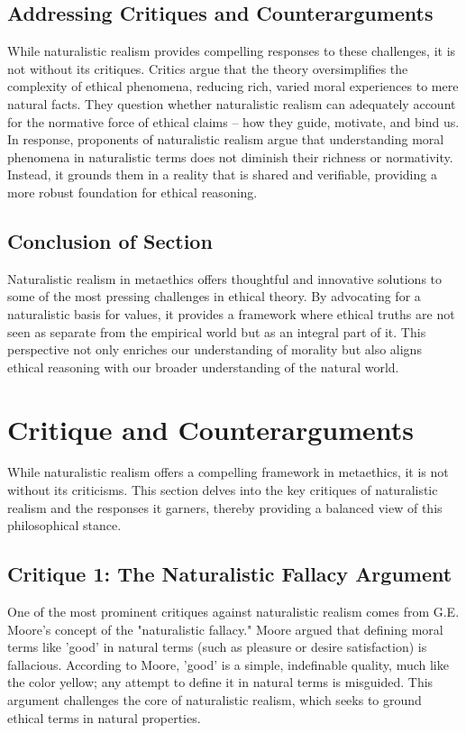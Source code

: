\documentclass[12pt,a4paper]{article}
\begin{document}
\subsection{Addressing Critiques and Counterarguments}
While naturalistic realism provides compelling responses to these challenges, it is not without its critiques. Critics argue that the theory oversimplifies the complexity of ethical phenomena, reducing rich, varied moral experiences to mere natural facts. They question whether naturalistic realism can adequately account for the normative force of ethical claims – how they guide, motivate, and bind us. In response, proponents of naturalistic realism argue that understanding moral phenomena in naturalistic terms does not diminish their richness or normativity. Instead, it grounds them in a reality that is shared and verifiable, providing a more robust foundation for ethical reasoning.

\subsection{Conclusion of Section}
Naturalistic realism in metaethics offers thoughtful and innovative solutions to some of the most pressing challenges in ethical theory. By advocating for a naturalistic basis for values, it provides a framework where ethical truths are not seen as separate from the empirical world but as an integral part of it. This perspective not only enriches our understanding of morality but also aligns ethical reasoning with our broader understanding of the natural world.

\section{Critique and Counterarguments}

While naturalistic realism offers a compelling framework in metaethics, it is not without its criticisms. This section delves into the key critiques of naturalistic realism and the responses it garners, thereby providing a balanced view of this philosophical stance.

\subsection{Critique 1: The Naturalistic Fallacy Argument}
One of the most prominent critiques against naturalistic realism comes from G.E. Moore's concept of the "naturalistic fallacy." Moore argued that defining moral terms like 'good' in natural terms (such as pleasure or desire satisfaction) is fallacious. According to Moore, 'good' is a simple, indefinable quality, much like the color yellow; any attempt to define it in natural terms is misguided. This argument challenges the core of naturalistic realism, which seeks to ground ethical terms in natural properties.
\end{document}
